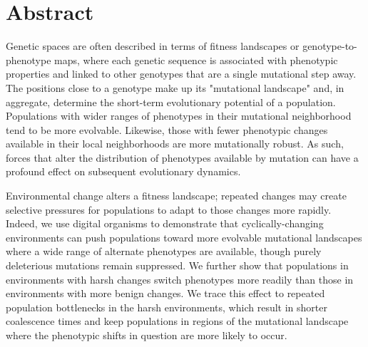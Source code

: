 \documentclass[10pt,letterpaper,final]{article}
\begin{document}
\section*{Abstract}
Genetic spaces are often described in terms of fitness landscapes or genotype-to-phenotype maps, where each genetic sequence is associated with phenotypic properties and linked to other genotypes that are a single mutational step away.  The positions close to a genotype make up its "mutational landscape" and, in aggregate, determine the short-term evolutionary potential of a population.
Populations with wider ranges of phenotypes in their mutational neighborhood tend to be more evolvable. Likewise, those with fewer phenotypic changes available in their local neighborhoods are more mutationally robust. As such, forces that alter the distribution of phenotypes available by mutation can have a profound effect on subsequent evolutionary dynamics.

Environmental change alters a fitness landscape; repeated changes may create selective pressures for populations to adapt to those changes more rapidly.  Indeed, we use digital organisms to demonstrate that cyclically-changing environments can push populations toward more evolvable mutational landscapes where a wide range of alternate phenotypes are available, though purely deleterious mutations remain suppressed.
We further show that populations in environments with harsh changes switch phenotypes more readily than those in environments with more benign changes. We trace this effect to repeated population bottlenecks in the harsh environments, which result in shorter coalescence times and keep populations in regions of the mutational landscape where the phenotypic shifts in question are more likely to occur.

\linenumbers

\end{document}
